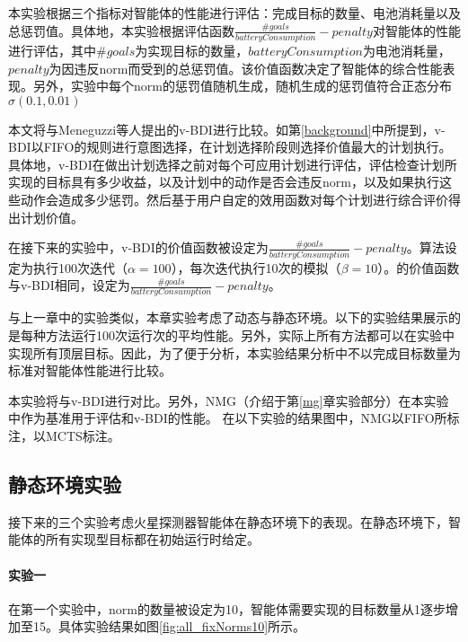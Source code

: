 本实验根据三个指标对智能体的性能进行评估：完成目标的数量、电池消耗量以及总惩罚值。具体地，本实验根据评估函数$\frac{\#goals}{batteryConsumption} - penalty$对智能体的性能进行评估，其中$\#goals$为实现目标的数量，$batteryConsumption$为电池消耗量，$penalty$为因违反norm而受到的总惩罚值。该价值函数决定了智能体的综合性能表现。另外，实验中每个norm的惩罚值随机生成，随机生成的惩罚值符合正态分布$\sigma(0.1, 0.01)$

本文将\SAN 与Meneguzzi等人提出的v-BDI\cite{DBLP:journals/eaai/MeneguzziROVL15}进行比较。如第\ref{background}中所提到，v-BDI以FIFO的规则进行意图选择，在计划选择阶段则选择价值最大的计划执行。具体地，v-BDI在做出计划选择之前对每个可应用计划进行评估，评估检查计划所实现的目标具有多少收益，以及计划中的动作是否会违反norm，以及如果执行这些动作会造成多少惩罚。然后基于用户自定的效用函数对每个计划进行综合评价得出计划价值。

在接下来的实验中，v-BDI的价值函数被设定为$\frac{\#goals}{batteryConsumption} - penalty$。\SAN 算法设定为执行100次迭代（$\alpha = 100$），每次迭代执行10次的模拟（$\beta = 10$）。\SAN 的价值函数与v-BDI相同，设定为$\frac{\#goals}{batteryConsumption} - penalty$。

与上一章中的实验类似，本章实验考虑了动态与静态环境。以下的实验结果展示的是每种方法运行100次运行次的平均性能。另外，实际上所有方法都可以在实验中实现所有顶层目标。因此，为了便于分析，本实验结果分析中不以完成目标数量为标准对智能体性能进行比较。

本实验将\SAN 与v-BDI进行对比。另外，NMG（介绍于第\ref{mg}章实验部分）在本实验中作为基准用于评估\SAN 和v-BDI的性能。
在以下实验的结果图中，NMG以FIFO所标注，\SAN 以MCTS标注。
\subsection{静态环境实验}
接下来的三个实验考虑火星探测器智能体在静态环境下的表现。在静态环境下，智能体的所有实现型目标都在初始运行时给定。
\paragraph{实验一}
在第一个实验中，norm的数量被设定为10，智能体需要实现的目标数量从1逐步增加至15。具体实验结果如图\ref{fig:all_fixNorms10}所示。

